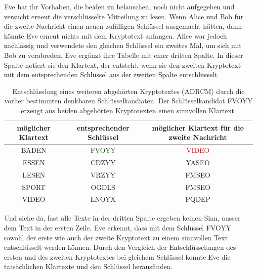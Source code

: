 Eve hat ihr Vorhaben, die beiden zu belauschen, noch nicht aufgegeben und versucht
erneut die verschlüsselte Mitteilung zu lesen. Wenn Alice und Bob für die zweite Nachricht einen neuen zufälligen Schlüssel ausgemacht hätten, dann könnte Eve erneut nichts mit dem Kryptotext anfangen. Alice war jedoch nachlässig und verwendete den gleichen
Schlüssel ein zweites Mal, um sich mit Bob zu verabreden.
Eve ergänzt ihre Tabelle mit einer dritten Spalte. In dieser Spalte notiert sie den Klartext,
der entsteht, wenn sie den zweiten Kryptotext mit dem entsprechenden Schlüssel aus der
zweiten Spalte entschlüsselt.
\begin{table}[H]
	\centering
	\begin{tabular}{c|c|c}
		möglicher Klartext & entsprechender Schlüssel     & möglicher Klartext für die zweite Nachricht \\ \midrule
		BADEN              & \textcolor{DarkGreen}{FVOYY} & \textcolor{Red}{VIDEO}                      \\
		ESSEN              & CDZYY                        & YASEO                                       \\
		LESEN              & VRZYY                        & FMSEO                                       \\
		SPORT              & OGDLS                        & FMSEO                                       \\
		VIDEO              & LNOYX                        & PQDEP
	\end{tabular}
	\caption{Entschlüsslung eines weiteren abgehörten Kryptotextes (ADRCM) durch die vorher bestimmten denkbaren Schlüsselkandiaten. Der Schlüsselkandidat FVOYY erzeugt aus beiden abgehörten Kryptotexten einen sinnvollen Klartext.}
	\label{tab:ADRCM}
\end{table}
\noindent
Und siehe da, fast alle Texte in der dritten Spalte ergeben keinen Sinn, ausser dem Text
in der ersten Zeile. Eve erkennt, dass mit dem Schlüssel FVOYY sowohl der erste wie auch
der zweite Kryptotext zu einem sinnvollen Text entschlüsselt werden können. Durch den
Vergleich der Entschlüsselungen des ersten und des zweiten Kryptotextes bei gleichem
Schlüssel konnte Eve die tatsächlichen Klartexte und den Schlüssel herausfinden.

\clearpage
